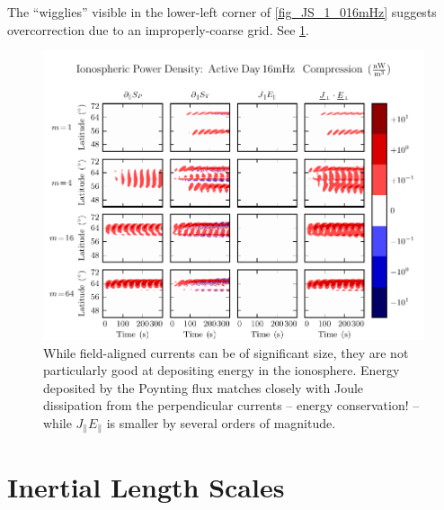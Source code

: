 
The ``wigglies'' visible in the lower-left corner of \cref{fig_JS_1_016mHz} suggests overcorrection due to an improperly-coarse grid. See \cref{sec_lengths}. 


\begin{figure}[H]
    \centering
    \includegraphics[width=\textwidth]{figures/JE_1_016mHz.pdf}
    \caption[Ionospheric Power Density]{
      While field-aligned currents can be of significant size, they are not particularly good at depositing energy in the ionosphere. Energy deposited by the Poynting flux matches closely with Joule dissipation from the perpendicular currents -- energy conservation! -- while $J_\parallel E_\parallel$ is smaller by several orders of magnitude. 
    }
    \label{fig_JE_1_016mHz}
\end{figure}

\section{Inertial Length Scales}
  \label{sec_lengths}

